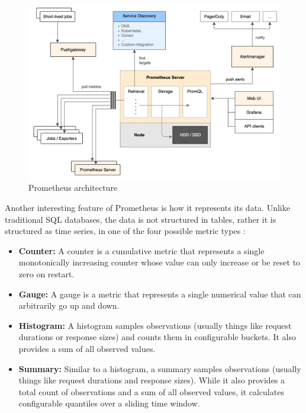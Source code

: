 \begin{figure}
    \centering
    \includegraphics[width=\textwidth]{gfx/prometheus_architecture.png}
    \caption[Prometheus architecture]{Prometheus architecture\footnotemark}
    \label{fig:prometheus_architecture}
\end{figure}


Another interesting feature of Prometheus is how it represents its data. Unlike traditional SQL databases, the data is not structured in tables, rather it is structured as time series, in one of the four possible metric types \cite{prometheus_metrics}:
\begin{itemize}
    \item \textbf{Counter: }A counter is a cumulative metric that represents a single monotonically increasing counter whose value can only increase or be reset to zero on restart.
    \item \textbf{Gauge: }A gauge is a metric that represents a single numerical value that can arbitrarily go up and down.
    \item \textbf{Histogram: }A histogram samples observations (usually things like request durations or response sizes) and counts them in configurable buckets. It also provides a sum of all observed values.
    \item \textbf{Summary: }Similar to a histogram, a summary samples observations (usually things like request durations and response sizes). While it also provides a total count of observations and a sum of all observed values, it calculates configurable quantiles over a sliding time window.
\end{itemize}

